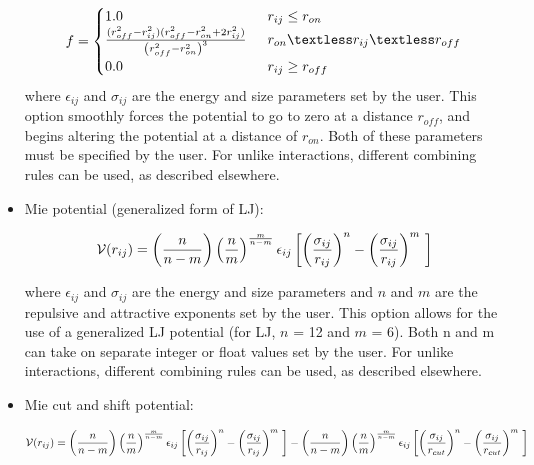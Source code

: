 \begin{itemize}
\begin{eqnarray}
	f = 
	\begin{cases}
	
		1.0 \, \, \, &  r_ {ij}  \le r_{on} \\
		\frac { (r_{off}^2 - r_{ij}^2) (r_{off}^2 - r_{on}^2 + 2r_{ij}^2)} {\left ( r_{off}^2 - r_{on}^2 \right )^3}  \, \, \,  & r_{on} \textless r_{ij} \textless r_{off}\\
		0.0 \, \, \, & r_{ij} \ge r_{off} 
		
	\end{cases}
\end{eqnarray}
where $\epsilon_{ij}$ and $\sigma_{ij}$ are the energy and size
parameters set by the user. This option smoothly forces the potential
to go to zero at a distance $r_{off}$, and begins altering the
potential at a distance of $r_{on}$. Both of these parameters must be
specified by the user. For unlike interactions, different 
combining rules can be used, as described elsewhere.



\item Mie potential (generalized form of LJ):

\begin{equation}
 {\cal V}(r_{ij})=  \left ( \frac{n}{n-m} \right ) \left ( \frac {n}{m} \right )^{\frac{m}{n-m}}\epsilon_{ij} \left [  \left ( \frac {\sigma_{ij}} { r_{ij} }\right )^{n} - \left ( \frac {\sigma_{ij}} { r_{ij} }\right )^{m}\ \right  ] 
 \label{Eq:mie}
\end{equation}



where $\epsilon_{ij}$ and $\sigma_{ij}$ are the energy and size
parameters and $n$ and $m$ are the repulsive and attractive exponents set by the user. This option allows for the use of a generalized LJ potential (for LJ, $n$ = 12 and $m$ = 6). Both n and m can take on separate integer or float values set by the user. For unlike interactions, different 
combining rules can be used, as described elsewhere.

\item Mie cut and shift potential:

\begin{equation}
 {\cal V}(r_{ij})=  \left ( \frac{n}{n-m} \right ) \left ( \frac {n}{m} \right )^{\frac{m}{n-m}}\epsilon_{ij} \left [  \left ( \frac {\sigma_{ij}} { r_{ij} }\right )^{n} - \left ( \frac {\sigma_{ij}} { r_{ij} }\right )^{m}\ \right  ] -  \left ( \frac{n}{n-m} \right ) \left ( \frac {n}{m} \right )^{\frac{m}{n-m}}\epsilon_{ij} \left [  \left ( \frac {\sigma_{ij}} { r_{cut}}\right )^{n} - \left ( \frac {\sigma_{ij}} { r_{cut} }\right )^{m}\ \right]  
 \label{Eq:mie}
\end{equation}




\end{itemize}
